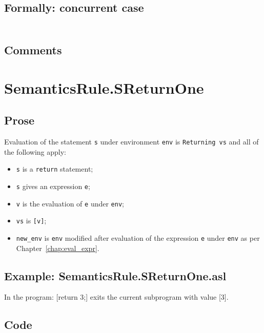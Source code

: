 \documentclass{book}
\begin{document}
  \subsection{Formally: concurrent case}
  \begin{align}
  \end{align} 

    \subsection{Comments}

\section{SemanticsRule.SReturnOne \label{sec:SemanticsRule.SReturnOne}}

    \subsection{Prose}
Evaluation of the statement \texttt{s} under environment \texttt{env} is
\texttt{Returning vs} and all of the following apply:
    \begin{itemize}
    \item \texttt{s} is a \texttt{return} statement;
    \item \texttt{s} gives an expression \texttt{e};
    \item \texttt{v} is the evaluation of \texttt{e} under \texttt{env};
    \item \texttt{vs} is \texttt{[v]};
    \item \texttt{new\_env} is \texttt{env} modified after evaluation of the expression \texttt{e} under \texttt{env} as per Chapter~\ref{chap:eval_expr}.
    \end{itemize}

    \subsection{Example: SemanticsRule.SReturnOne.asl}
    In the program:
    [return 3;] exits the current subprogram with value [3].

  \subsection{Code}
\end{document}

